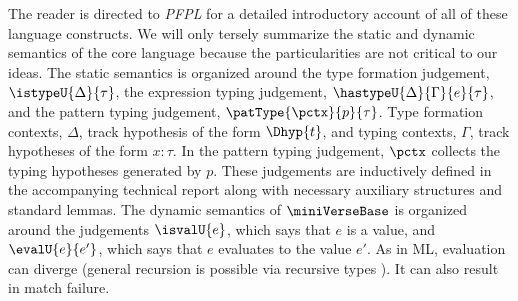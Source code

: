 \documentclass[acmsmall]{acmart}
\begin{document}
 The reader is directed to \emph{PFPL} \cite{pfple1} for a detailed introductory account of all of these language constructs. We will only tersely summarize the static and dynamic semantics of the core language because the particularities are not critical to our ideas. The static semantics is organized around the type formation judgement, $\istypeU{\Delta}{\tau}$, the expression typing judgement, $\hastypeU{\Delta}{\Gamma}{e}{\tau}$, and the pattern typing judgement, $\patType{\pctx}{p}{\tau}$. Type formation contexts, $\Delta$, track hypothesis of the form $\Dhyp{t}$, and typing contexts, $\Gamma$, track hypotheses of the form $x : \tau$. In the pattern typing judgement, $\pctx$ collects the typing hypotheses generated by $p$. These judgements are inductively defined in the accompanying technical report along with necessary auxiliary structures and standard lemmas. The dynamic semantics of $\miniVerseBase$ is organized around the judgements $\isvalU{e}$, which says that $e$ is a value, and $\evalU{e}{e'}$, which says that $e$ evaluates to the value $e'$. As in ML, evaluation can diverge (general recursion is possible via recursive types \cite{pfple1}). It can also result in match failure.%
\end{document}
